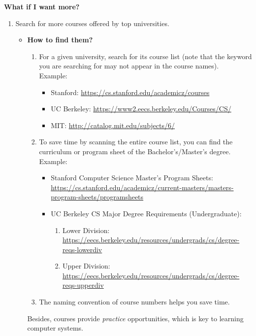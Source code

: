 \documentclass{article}
\begin{document}
\noindent
\textbf{What if I want more?}
\begin{enumerate}
    \item Search for more courses offered by top universities.
    \begin{itemize}
        \item \textbf{How to find them?}
        \begin{enumerate}
            \item For a given university, search for its course list (note that the keyword you are searching for may not appear in the course names).\\
            Example:
            \begin{itemize}
                \item Stanford:
                \href{https://cs.stanford.edu/academicz/courses}{https://cs.stanford.edu/academicz/courses}
                \item UC Berkeley:
                \href{https://www2.eecs.berkeley.edu/Courses/CS/}{https://www2.eecs.berkeley.edu/Courses/CS/}
                \item MIT:
                \href{http://catalog.mit.edu/subjects/6/}{http://catalog.mit.edu/subjects/6/}
            \end{itemize}
            \item To save time by scanning the entire course list, you can find the curriculum or program sheet of the Bachelor's/Master's degree.\\
            Example:
            \begin{itemize}
                \item Stanford Computer Science Master's Program Sheets:\\
                \href{https://cs.stanford.edu/academicz/current-masters/masters-program-sheets/programsheets}{https://cs.stanford.edu/academicz/current-masters/masters-program-sheets/programsheets}
                \item UC Berkeley CS Major Degree Requirements (Undergraduate):
                \begin{enumerate}
                    \item Lower Division:\\
                    \href{https://eecs.berkeley.edu/resources/undergrads/cs/degree-reqs-lowerdiv}{https://eecs.berkeley.edu/resources/undergrads/cs/degree-reqs-lowerdiv}
                    \item Upper Division:\\
                    \href{https://eecs.berkeley.edu/resources/undergrads/cs/degree-reqs-upperdiv}{https://eecs.berkeley.edu/resources/undergrads/cs/degree-reqs-upperdiv}
                \end{enumerate}
            \end{itemize}
            \item The naming convention of course numbers helps you save time.
        \end{enumerate}
        Besides, courses provide \emph{practice} opportunities, which is key to learning computer systems.
    \end{itemize}
    

\end{enumerate}
\end{document}
